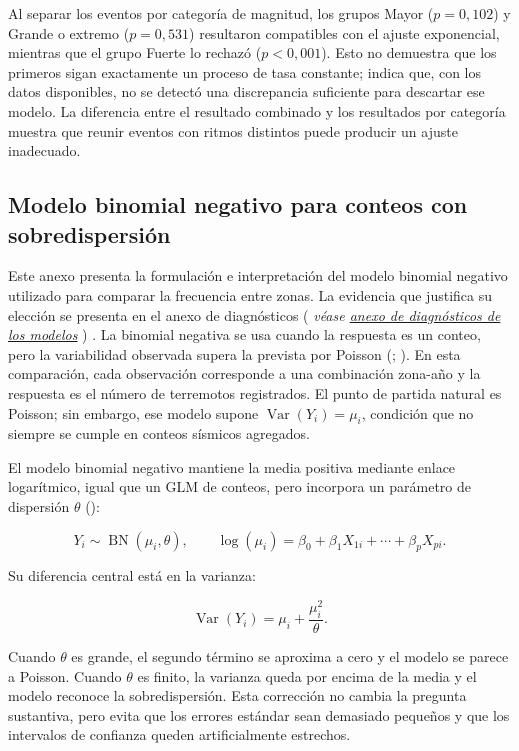 \documentclass[
  spanish,
  letterpaper,
  DIV=11,
  numbers=noendperiod]{scrartcl}
\newcommand{\asesoriaParenRef}[1]{%
  \textnormal{\textcolor{asesoriaTextColor}{(}}%
  {\hypersetup{linkcolor=asesoriaLinkColor,urlcolor=asesoriaLinkColor,citecolor=asesoriaLinkColor}\textcolor{asesoriaTextColor}{\emph{#1}}}%
  \textnormal{\textcolor{asesoriaTextColor}{)}}%
}
\begin{document}
Al separar los eventos por categoría de magnitud, los grupos Mayor
(\(p=0{,}102\)) y Grande o extremo (\(p=0{,}531\)) resultaron
compatibles con el ajuste exponencial, mientras que el grupo Fuerte lo
rechazó (\(p<0{,}001\)). Esto no demuestra que los primeros sigan
exactamente un proceso de tasa constante; indica que, con los datos
disponibles, no se detectó una discrepancia suficiente para descartar
ese modelo. La diferencia entre el resultado combinado y los resultados
por categoría muestra que reunir eventos con ritmos distintos puede
producir un ajuste inadecuado.

\subsection{Modelo binomial negativo para conteos con
sobredispersión}\label{sec-anexo-binomial-negativa}

Este anexo presenta la formulación e interpretación del modelo binomial
negativo utilizado para comparar la frecuencia entre zonas. La evidencia
que justifica su elección se presenta en el anexo de diagnósticos
\asesoriaParenRef{véase \hyperref[sec-anexo-diagnosticos]{anexo de diagnósticos de los modelos}}.
La binomial negativa se usa cuando la respuesta es un conteo, pero la
variabilidad observada supera la prevista por Poisson
(;
). En esta
comparación, cada observación corresponde a una combinación zona-año y
la respuesta es el número de terremotos registrados. El punto de partida
natural es Poisson; sin embargo, ese modelo supone
\(\operatorname{Var}(Y_i)=\mu_i\), condición que no siempre se cumple en
conteos sísmicos agregados.

El modelo binomial negativo mantiene la media positiva mediante enlace
logarítmico, igual que un GLM de conteos, pero incorpora un parámetro de
dispersión \(\theta\) ():

\[
Y_i \sim \operatorname{BN}(\mu_i,\theta),
\qquad
\log(\mu_i)=\beta_0+\beta_1 X_{1i}+\cdots+\beta_p X_{pi}.
\]

Su diferencia central está en la varianza:

\[
\operatorname{Var}(Y_i)=\mu_i+\frac{\mu_i^2}{\theta}.
\]

Cuando \(\theta\) es grande, el segundo término se aproxima a cero y el
modelo se parece a Poisson. Cuando \(\theta\) es finito, la varianza
queda por encima de la media y el modelo reconoce la sobredispersión.
Esta corrección no cambia la pregunta sustantiva, pero evita que los
errores estándar sean demasiado pequeños y que los intervalos de
confianza queden artificialmente estrechos.
\end{document}
